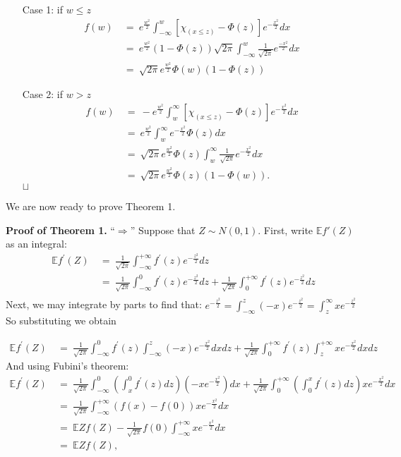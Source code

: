 \documentclass[12pt]{article}
\newcommand{\e}{\mathbb{E}}
\newcommand\qed{\hfill\hbox{\rlap{$\sqcap$}$\sqcup$}}
\newcommand{\eq }{\: = \:}
\theoremstyle{nonumberplain}
\begin{document}
\begin{itemize}
\item[Case 1:] if $w\leq z$
\begin{align*}
f(w)&\eq e^{\frac{w^{2}}{2}} \int_{-\infty}^{w}[\chi_{(x\leq z)}-\Phi(z)]e^{-\frac{x^{2}}{2}}dx\\
&\eq e^{\frac{w^{2}}{2}}(1-\Phi(z))\sqrt{2\pi} \int_{-\infty}^{w} \frac{1}{\sqrt{2\pi}}e^{\frac{-x^{2}}{2}}dx\\
&\eq \sqrt{2\pi}e^{\frac{w^{2}}{2}}\Phi(w)(1-\Phi(z))
\end{align*}

\item[Case 2:] if $w>z$
\begin{align*}
f(w)&\eq -e^{\frac{w^{2}}{2}} \int_{w}^{\infty}[\chi_{(x\leq z)}-\Phi(z)]e^{-\frac{x^{2}}{2}}dx \\
&\eq e^{\frac{w^{2}}{2}} \int_{w}^{\infty} e^{-\frac{x^{2}}{2}} \Phi(z) dx\\
&\eq \sqrt{2\pi} e^{\frac{w^{2}}{2}} \Phi(z) \int_{w}^{\infty} \frac{1}{\sqrt{2\pi}} e^{-\frac{x^{2}}{2}}dx\\
&\eq \sqrt{2\pi} e^{\frac{w^{2}}{2}} \Phi(z) (1-\Phi(w)).
\end{align*}
\qed
\end{itemize} 
We are now ready to prove Theorem 1.

\textbf{Proof of Theorem 1.} ``$\Longrightarrow$'' Suppose that $Z\sim N(0,1)$. First, write $\e f'(Z)$ as an integral:
\begin{align*}
\mathbb{E}f^{\prime}(Z)&\eq \frac{1}{\sqrt{2\pi}} \int_{-\infty}^{+\infty} f^{\prime}(z)e^{-\frac{z^{2}}{2}} dz
  \\
  &\eq \frac{1}{\sqrt{2\pi}} \int_{-\infty}^{0} f^{\prime}(z)e^{-\frac{z^{2}}{2}} dz +\frac{1}{\sqrt{2\pi}} \int_{0}^{+\infty} f^{\prime}(z)e^{-\frac{z^{2}}{2}} dz
  \\
\end{align*}
Next, we may integrate by parts to find that: $e^{-\frac{z^2}{2}} = 
\int_{-\infty}^{z}(-x)e^{-\frac{z^2}{2}} = \int_{z}^{\infty}xe^{-\frac{z^2}{2}}$ \\
So substituting we obtain

\begin{align*}
\mathbb{E}f^{\prime}(Z) &\eq \frac{1}{\sqrt{2\pi}} \int_{-\infty}^{0} f^{\prime}(z) \int_{-\infty}^{z}(-x) e^{-\frac{x^{2}}{2}} dxdz +\frac{1}{\sqrt{2\pi}} \int_{0}^{+\infty} f^{\prime}(z) \int_{z}^{+\infty}xe^{-\frac{x^{2}}{2}} dxdz
\end{align*}
And using Fubini's theorem:
\begin{align*}
\mathbb{E}f^{\prime}(Z) &\eq \frac{1}{\sqrt{2\pi}} \int_{-\infty}^{0}(\int_{x}^{0}f^{\prime}(z)dz)(-xe^{-\frac{x^{2}}{2}})dx + \frac{1}{\sqrt{2\pi}} \int_{0}^{+\infty}(\int_{0}^{x}f^{\prime}(z)dz)xe^{-\frac{x^{2}}{2}}dx
  \\
  &\eq \frac{1}{\sqrt{2\pi}} \int_{-\infty}^{+\infty} (f(x)-f(0)) xe^{-\frac{x^{2}}{2}}dx
  \\
  &\eq \mathbb{E}Zf(Z)-\frac{1}{\sqrt{2\pi}}f(0) \int_{-\infty}^{+\infty}xe^{-\frac{x^{2}}{2}}dx
  \\
  &\eq \mathbb{E}Zf(Z),
\end{align*}
\end{document}

